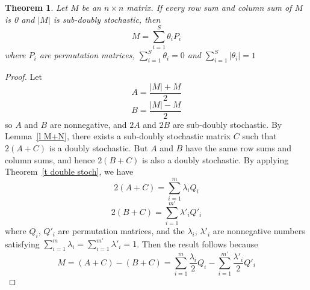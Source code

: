 \documentclass[12pt]{amsart}
\newtheorem{thm}{Theorem}
\begin{document}
\begin{thm}
\label{t sub stoch}
Let $M$ be an $n\times n$ matrix. If every row sum and column sum of
$M$ is 0 and $|M|$ is sub-doubly stochastic, then
\[M=\sum_{i=1}^S \theta _iP_i\] where $P_i$ are permutation matrices,
$\sum_{i=1}^S \theta _i=0$ and $\sum_{i=1}^S |\theta _i|=1$
\end{thm}

\begin{proof}
Let
\[A=\frac{|M|+M}{2}\]
\[B=\frac{|M|-M}{2}\]
so $A$ and $B$ are nonnegative, and $2A$ and $2B$ are sub-doubly
stochastic.
By Lemma~\ref{l M+N}, there exists a sub-doubly stochastic matrix $C$
such that $2(A+C)$ is a doubly stochastic. But $A$ and $B$ have
the same row sums and column sums, and hence $2(B+C)$ is also a doubly
stochastic. By applying Theorem~\ref{t double stoch}, we have
\[2(A+C)=\sum_{i=1}^m \lambda _iQ_i\]
\[2(B+C)=\sum_{i=1}^{m'} \lambda '_iQ'_i\]
where $Q_i$, $Q'_i$ are permutation matrices, and the $\lambda
_i$, $\lambda'_i$  are nonnegative numbers satisfying
$\sum_{i=1}^m \lambda_i =\sum_{i=1}^{m'} \lambda'_i =1$.
Then the result follows because
\[M=(A+C)-(B+C)=\sum_{i=1}^m \frac{\lambda _i}{2}Q_i -\sum_{i=1}^{m'} \frac{\lambda '_i}{2}Q'_i\]
\end{proof}
\end{document}
